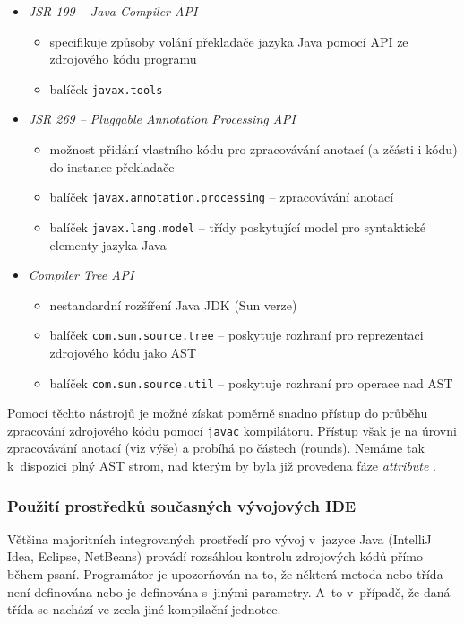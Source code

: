 \begin{itemize}
\item \emph{JSR 199 -- Java Compiler API} \cite{apidoc:javacompilerapi}
  \begin{itemize}
  \item specifikuje způsoby volání překladače jazyka Java pomocí API ze zdrojového kódu programu
  \item balíček \verb+javax.tools+
  \end{itemize}
\item \emph{JSR 269 -- Pluggable Annotation Processing API}
  \begin{itemize}
  \item možnost přidání vlastního kódu pro zpracovávání anotací (a zčásti i kódu) do instance překladače
  \item balíček \verb+javax.annotation.processing+ -- zpracovávání anotací
  \item balíček \verb+javax.lang.model+ -- třídy poskytující model pro syntaktické elementy jazyka Java
  \end{itemize}
\item \emph{Compiler Tree API} \cite{parsertools:compilertreeapi}
  \begin{itemize}
  \item nestandardní rozšíření Java JDK (Sun verze)
  \item balíček \verb+com.sun.source.tree+ -- poskytuje rozhraní pro reprezentaci zdrojového kódu jako AST
  \item balíček \verb+com.sun.source.util+ -- poskytuje rozhraní pro operace nad AST
  \end{itemize}
\end{itemize}

Pomocí těchto nástrojů je možné získat poměrně snadno přístup do průběhu zpracování zdrojového kódu pomocí \verb+javac+ kompilátoru. Přístup však je na úrovni zpracovávání anotací (viz výše) a probíhá po částech (rounds). Nemáme tak k~dispozici plný AST strom, nad kterým by byla již provedena fáze \emph{attribute} \cite{hackers_guide_to_javac}.

\subsubsection{Použití prostředků současných vývojových IDE}
Většina majoritních integrovaných prostředí pro vývoj v~jazyce Java (IntelliJ Idea, Eclipse, NetBeans) provádí rozsáhlou kontrolu zdrojových kódů přímo během psaní. Programátor je upozorňován na to, že některá metoda nebo třída není definována nebo je definována s~jinými parametry. A~to v~případě, že daná třída se nachází ve zcela jiné kompilační jednotce.

